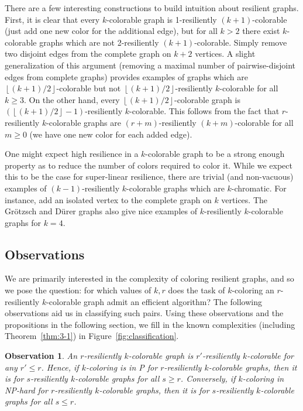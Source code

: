 \documentclass[10pt]{article}
\newtheorem{obs}{Observation}
\begin{document}
There are a few interesting constructions to build intuition about resilient
graphs. First, it is clear that every $k$-colorable graph is 1-resiliently
$(k+1)$-colorable (just add one new color for the additional edge), but for all
$k > 2$ there exist $k$-colorable graphs which are not 2-resiliently
$(k+1)$-colorable. Simply remove two disjoint edges from the complete graph on
$k+2$ vertices. A slight generalization of this argument (removing a maximal
number of pairwise-disjoint edges from complete graphs) provides examples of
graphs which are $\left \lfloor (k+1)/2\right \rfloor$-colorable but not $\left
\lfloor (k+1)/2 \right \rfloor$-resiliently $k$-colorable for all $k \geq 3$.
On the other hand, every $\left \lfloor (k+1)/2\right \rfloor$-colorable graph
is $(\left \lfloor (k+1)/2 \right \rfloor-1)$-resiliently $k$-colorable. This
follows from the fact that $r$-resiliently $k$-colorable graphs are
$(r+m)$-resiliently $(k+m)$-colorable for all $m \geq 0$ (we have one new color
for each added edge). 

One might expect high resilience in a $k$-colorable graph to be a strong enough
property as to reduce the number of colors required to color it. While we
expect this to be the case for super-linear resilience, there are trivial
(and non-vacuous) examples of $(k-1)$-resiliently $k$-colorable graphs which are
$k$-chromatic. For instance, add an isolated vertex to the complete graph on
$k$ vertices. The Gr{\"o}tzsch and D{\"u}rer graphs also give nice examples
of $k$-resiliently $k$-colorable graphs for $k=4$. 

\subsection{Observations}

We are primarily interested in the complexity of coloring resilient graphs, and
so we pose the question: for which values of $k,r$ does the task of
$k$-coloring an $r$-resiliently $k$-colorable graph admit an efficient
algorithm? The following observations aid us in classifying such pairs. Using
these observations and the propositions in the following section, we fill in
the known complexities (including Theorem~\ref{thm:3-1}) in
Figure~\ref{fig:classification}.

\begin{obs}\label{obs:horizontal}
An $r$-resiliently $k$-colorable graph is $r'$-resiliently $k$-colorable for
any $r' \leq r$. Hence, if $k$-coloring is in P for $r$-resiliently
$k$-colorable graphs, then it is for $s$-resiliently $k$-colorable graphs for
all $s \geq r$.  Conversely, if $k$-coloring in NP-hard for $r$-resiliently
$k$-colorable graphs, then it is for $s$-resiliently $k$-colorable graphs for
all $s \leq r$. 
\end{obs}
\end{document}
